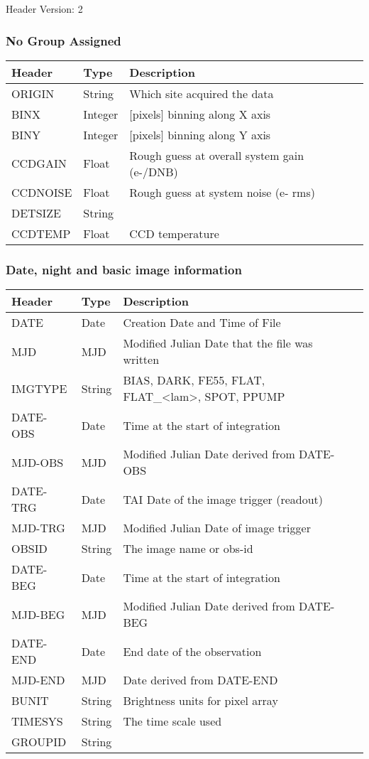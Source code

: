 Header Version: 2

\subsubsection{No Group Assigned}
\begin{tabular}{l l l l l}

\hline
Header & Type & Description \\
\hline
ORIGIN & String & Which site acquired the data \\
BINX & Integer & [pixels] binning along X axis \\
BINY & Integer & [pixels] binning along Y axis \\
CCDGAIN & Float & Rough guess at overall system gain (e-/DNB) \\
CCDNOISE & Float & Rough guess at system noise (e- rms) \\
DETSIZE & String &  \\
CCDTEMP & Float & CCD temperature \\
\hline
\end{tabular}


\subsubsection{Date, night and basic image information}
\begin{tabular}{l l l l l}

\hline
Header & Type & Description \\
\hline
DATE & Date & Creation Date and Time of File \\
MJD & MJD & Modified Julian Date that the file was written \\
IMGTYPE & String & BIAS, DARK, FE55, FLAT, FLAT\_<lam>, SPOT, PPUMP \\
DATE-OBS & Date & Time at the start of integration \\
MJD-OBS & MJD & Modified Julian Date derived from DATE-OBS \\
DATE-TRG & Date & TAI Date of the image trigger (readout) \\
MJD-TRG & MJD & Modified Julian Date of image trigger \\
OBSID & String & The image name or obs-id \\
DATE-BEG & Date & Time at the start of integration \\
MJD-BEG & MJD & Modified Julian Date derived from DATE-BEG \\
DATE-END & Date & End date of the observation \\
MJD-END & MJD & Date derived from DATE-END \\
BUNIT & String & Brightness units for pixel array \\
TIMESYS & String & The time scale used \\
GROUPID & String &  \\
\hline
\end{tabular}


